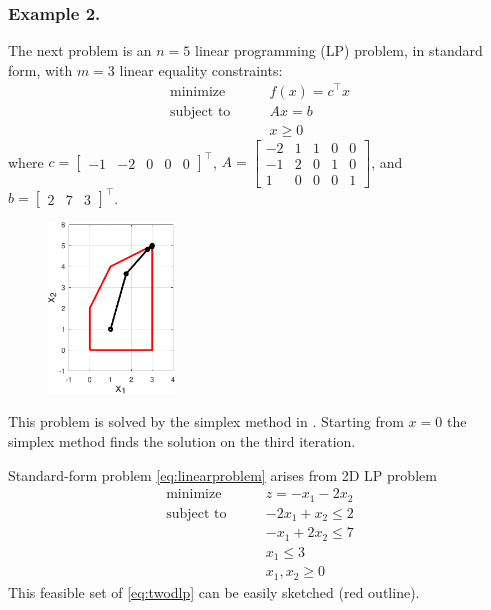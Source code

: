 \documentclass[11pt]{article}
\newcommand{\ds}{\displaystyle}
\begin{document}
\subsubsection*{Example 2.}

The next problem is an $n=5$ linear programming (LP) problem, in standard form, with $m=3$ linear equality constraints:
\begin{equation}
\begin{matrix}
\text{minimize} \qquad & f(x) = c^\top x \\
\text{subject to} \qquad & A x = b \\
 & x \ge 0
\end{matrix} \label{eq:linearproblem}
\end{equation}
where $\ds c = \begin{bmatrix} -1 & -2 & 0 & 0 & 0 \end{bmatrix}^\top$, $\ds A = \begin{bmatrix} -2 & 1 & 1 & 0 & 0 \\ -1 & 2 & 0 & 1 & 0 \\ 1 & 0 & 0 & 0 & 1 \end{bmatrix}$, and $\ds b = \begin{bmatrix} 2 & 7 & 3 \end{bmatrix}^\top$.

\begin{figure}
\phantom{x} \hfill \includegraphics[width=0.3\textwidth]{figs/linear.pdf}
\end{figure}

\medskip
This problem is solved by the simplex method in \cite[section 5.2]{GrivaNashSofer2009}.  Starting from $x=0$ the simplex method finds the solution on the third iteration.

Standard-form problem \eqref{eq:linearproblem} arises from 2D LP problem
\begin{equation}
\begin{matrix}
\text{minimize} \qquad & z = -x_1 - 2x_2 \\
\text{subject to} \qquad & -2x_1 + x_2 \le 2 \\
 & -x_1 + 2x_2 \le 7 \\
 & x_1 \le 3 \\
 & x_1, x_2 \ge 0
\end{matrix} \label{eq:twodlp}
\end{equation}
This feasible set of \eqref{eq:twodlp} can be easily sketched (red outline).
\end{document}
